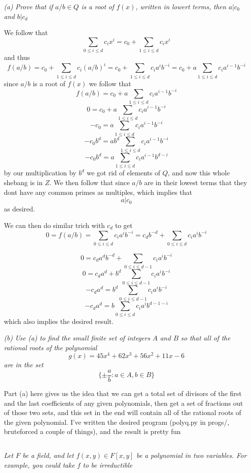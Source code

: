 \documentclass[11pt,oneside,titlepage]{book}
\newcommand{\set}[1]{\{ #1 \}}
\begin{document}
\textit{(a) Prove that if $a/b \in Q$ is a root of $f(x)$, written in lowert terms,
  then $a | c_0$ and $b | c_d$}

We follow that
$$\sum_{0 \leq i \leq d}{c_i x^i}  = c_0 + \sum_{1 \leq i \leq d}{c_i x^i} $$
and thus
$$f(a/b) = c_0 + \sum_{1 \leq i \leq d}{c_i (a/b)^i} =
c_0 + \sum_{1 \leq i \leq d}{c_i a^i b^{-i}} =
c_0 + a \sum_{1 \leq i \leq d}{c_i a^{i - 1} b^{-i}}$$
since $a/b$ is a root of $f(x)$ we follow that
$$f(a/b) = c_0 + a \sum_{1 \leq i \leq d}{c_i a^{i - 1} b^{-i}}$$
$$0 = c_0 + a \sum_{1 \leq i \leq d}{c_i a^{i - 1} b^{-i}}$$
$$-c_0 = a \sum_{1 \leq i \leq d}{c_i a^{i - 1} b^{-i}}$$
$$-c_0 b^d = a b^d \sum_{1 \leq i \leq d}{c_i a^{i - 1} b^{-i}}$$
$$-c_0 b^d = a \sum_{1 \leq i \leq d}{c_i a^{i - 1} b^{d - i}}$$
by our multiplication by $b^d$ we got rid of elements of $Q$, and now
this whole shebang is in $Z$.  We then follow that since $a/b$ are in
their lowest terms that they dont have any common primes as multiples,
which implies that
$$a | c_0$$
as desired.

We can then do similar trich with $c_d$ to get 
$$0 = f(a / b) = \sum_{0 \leq i \leq d}{c_i a^i b^{-i}} =
c_d b^{-d} +  \sum_{0 \leq i \leq d}{c_i a^i b^{-i}}$$

$$0 = c_d a^d b^{-d} +  \sum_{0 \leq i \leq d - 1}{c_i a^i b^{-i}}$$
$$0 = c_da^d  +  b^d \sum_{0 \leq i \leq d - 1}{c_i a^i b^{-i}}$$
$$-c_da^d =  b^d \sum_{0 \leq i \leq d - 1}{c_i a^i b^{-i}}$$
$$-c_da^d =  b \sum_{0 \leq i \leq d}{c_i a^i b^{d - 1 - i}}$$
which also implies the desired result.

\textit{(b) Use (a) to find the small finite set of integers $A$ and $B$ so that
  all of the rational roots of the polynomial
  $$g(x) = 45x^4 + 62x^3 + 56x^2 + 11x - 6$$
  are in the set
  $$\set{\pm \frac a b : a \in A, b \in B}$$}

Part (a) here gives us the idea that we can get a total set of
divisors of the first and the last coefficients of any given
polynomials, then get a set of fractions out of those two sets, and
this set in the end will contain all of the rational roots of the
given polynomial. I've written the desired program (polyq.py in
progs/, bruteforced a couple of things), and the result is pretty fun

\subsection{}

\textit{Let $F$ be a field, and let $f(x, y) \in F[x, y]$ be a
  polynomial in two variables. For example, you could take $f$ to be
  irreductible}
\end{document}
